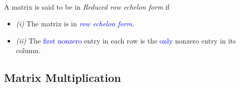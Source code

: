 \begin{definition} \qquad \\
A matrix is said to be in \emph{Reduced row echelon form} if

\begin{itemize}
\item
 \emph{(i)} The matrix is in \textcolor{blue}{\textit{row echelon form}}. 
 \item
\emph{(ii)} The \textcolor{blue}{first nonzero} entry in each row is the \textcolor{blue}{only} nonzero entry in its column.
\end{itemize}
\end{definition}
\subsection{Matrix Multiplication}
